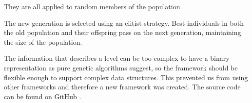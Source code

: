 \documentclass[sigconf]{acmart}
\begin{document}
They are all applied to random members of the population.

The new generation is selected using an elitist strategy. Best individuals in 
both the old population and their offspring pass on the next generation, 
maintaining the size of the population.








The information that describes a level can be too complex to have a binary 
representation as pure genetic algorithms suggest, so the framework should be 
flexible enough to support complex data structures. This prevented us from 
using other 
frameworks
and therefore a new framework was created. The source  code can be found on 
GitHub \cite{ab-level}.
\end{document}

